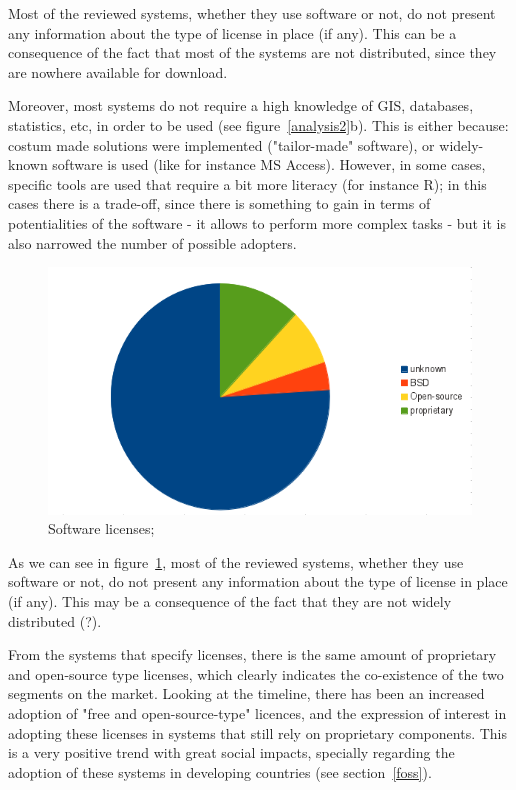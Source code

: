 \documentclass[11pt]{article} %
\begin{document}
Most of the reviewed systems, whether they use software or not, do not present any information about the type of license in place (if any). This can be a consequence of the fact that most of the systems are not distributed, since they are nowhere available for download.

Moreover, most systems do not require a high knowledge of GIS, databases, statistics, etc, in order to be used (see figure~\ref{analysis2}b). This is either because: costum made solutions were implemented ("tailor-made" software), or widely-known software is used (like for instance MS Access). However, in some cases, specific tools are used that require a bit more literacy (for instance R); in this cases there is a trade-off, since there is something to gain in terms of potentialities of the software - it allows to perform more complex tasks - but it is also narrowed the number of possible adopters. 

  \begin{figure}[!ht]%
    \begin{center} 
	\includegraphics[width=\textwidth ]{Chart_license.png}
      \caption[Software licenses;] {Software licenses;}
      \label{licensing} %
    \end{center} 
  \end{figure}

As we can see in figure~\ref{licensing}, most of the reviewed systems, whether they use software or not, do not present any information about the type of license in place (if any). This may be a consequence of the fact that they are not widely distributed (?).

From the systems that specify licenses, there is the same amount of proprietary and open-source type licenses, which clearly indicates the co-existence of the two segments on the market. Looking at the timeline, there has been an increased adoption of "free and open-source-type" licences, and the expression of interest in adopting these licenses in systems that still rely on proprietary components. This is a very positive trend with great social impacts, specially regarding the adoption of these systems in developing countries (see section~\ref{foss}).
\end{document}
